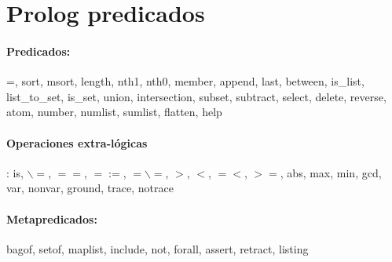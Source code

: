 \documentclass[10pt,a4paper]{article}
\begin{document}
\section{Prolog predicados}
\paragraph{Predicados:} 
=, sort, msort, length, nth1, nth0, member, append, last, between, is\_list, list\_to\_set, is\_set, union, intersection, subset, subtract, select, delete, reverse,  atom,  number, numlist, sumlist, flatten, help

\paragraph{Operaciones extra-lógicas}: is, $\backslash =$,  $==$,  $=:=$, $=\backslash=$, $>$, $<$, $=<$, $>=$, abs, max, min, gcd,  var,  nonvar, ground, trace, notrace

\paragraph{Metapredicados:} bagof, setof, maplist, include, not, forall, assert, retract, listing
\end{document}
